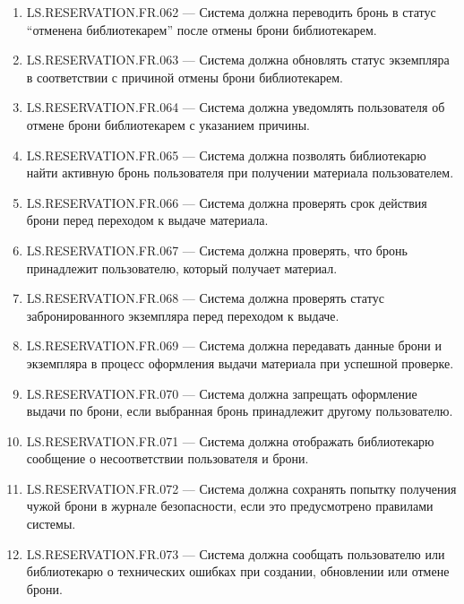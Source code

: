 \documentclass[12pt,a4paper]{article}
\begin{document}
\begin{enumerate}
		\item LS.RESERVATION.FR.062 --- Система должна переводить бронь в статус
		``отменена библиотекарем'' после отмены брони библиотекарем.
		
		\item LS.RESERVATION.FR.063 --- Система должна обновлять статус экземпляра в
		соответствии с причиной отмены брони библиотекарем.
		
		\item LS.RESERVATION.FR.064 --- Система должна уведомлять пользователя об
		отмене брони библиотекарем с указанием причины.
		
		\item LS.RESERVATION.FR.065 --- Система должна позволять библиотекарю найти
		активную бронь пользователя при получении материала пользователем.
		
		\item LS.RESERVATION.FR.066 --- Система должна проверять срок действия брони
		перед переходом к выдаче материала.
		
		\item LS.RESERVATION.FR.067 --- Система должна проверять, что бронь принадлежит
		пользователю, который получает материал.
		
		\item LS.RESERVATION.FR.068 --- Система должна проверять статус
		забронированного экземпляра перед переходом к выдаче.
		
		\item LS.RESERVATION.FR.069 --- Система должна передавать данные брони и
		экземпляра в процесс оформления выдачи материала при успешной проверке.
		
		\item LS.RESERVATION.FR.070 --- Система должна запрещать оформление выдачи по
		брони, если выбранная бронь принадлежит другому пользователю.
		
		\item LS.RESERVATION.FR.071 --- Система должна отображать библиотекарю сообщение
		о несоответствии пользователя и брони.
		
		\item LS.RESERVATION.FR.072 --- Система должна сохранять попытку получения
		чужой брони в журнале безопасности, если это предусмотрено правилами системы.
		
		\item LS.RESERVATION.FR.073 --- Система должна сообщать пользователю или
		библиотекарю о технических ошибках при создании, обновлении или отмене брони.
		

\end{enumerate}
\end{document}
